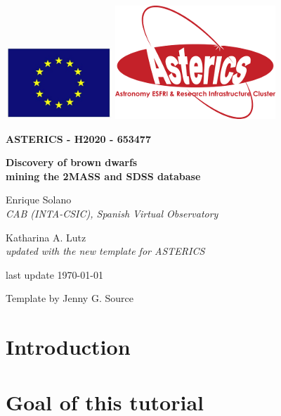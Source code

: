 \documentclass [a4paper, 12pt]{article}
\begin{document}
\begin{center}\includegraphics[width=0.3\textwidth]{../images/logo_euro.png} 
	\hspace{5cm}\includegraphics[width=0.4 
	\textwidth]{../images/logo_asterics.png}\\
\vspace{1.5cm}

\begin{Huge} 
	\textbf{ASTERICS - H2020 - 653477} 
\end{Huge} 
\end{center}
	
	
\vspace{1cm}
\Huge
\begin{center}
	\bf Discovery of brown dwarfs \\ mining the 2MASS and SDSS database
\end{center}
	
	
\vspace{1cm}
\large
\begin{center}
	Enrique Solano\\ 
	\textit{CAB (INTA-CSIC), Spanish Virtual Observatory}
\end{center}
\vspace{0.5cm}
\begin{center}
	Katharina A. Lutz\\
	\textit{updated with the new template for ASTERICS}
\end{center}
\vspace{0.5cm}
\begin{center}
	last update \today
\end{center}

\vspace{3.5cm}
Template by Jenny G. Source
	
	
	
\newpage
\normalsize
\vfill
\tableofcontents
\vfill
	
\newpage
	
\justify
\section{Introduction}
	
\section{Goal of this tutorial} 
	
	
\end{document}
